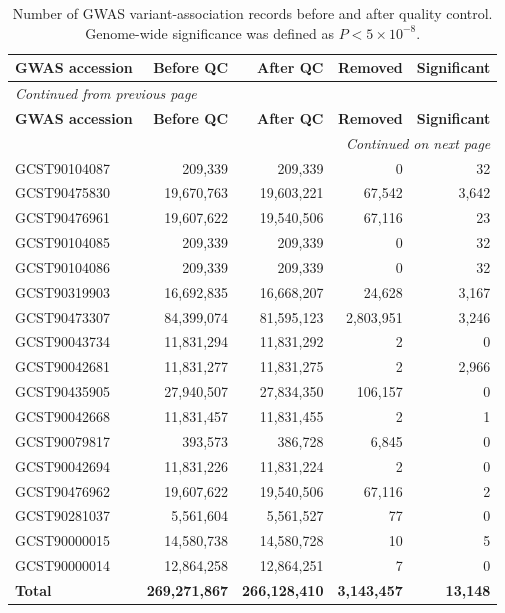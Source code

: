 \documentclass[11pt,a4paper]{article}
\begin{document}
\begin{longtable}{@{}lrrrr@{}}
\caption{Number of GWAS variant-association records
before and after quality control. Genome-wide
significance was defined as $P < 5 \times 10^{-8}$.}
\label{tab:gwas_qc_results}\\

\toprule
\textbf{GWAS accession} &
\textbf{Before QC} &
\textbf{After QC} &
\textbf{Removed} &
\textbf{Significant} \\
\midrule
\endfirsthead

\multicolumn{5}{l}{\textit{Continued from previous page}}\\
\toprule
\textbf{GWAS accession} &
\textbf{Before QC} &
\textbf{After QC} &
\textbf{Removed} &
\textbf{Significant} \\
\midrule
\endhead

\midrule
\multicolumn{5}{r}{\textit{Continued on next page}}\\
\endfoot
\bottomrule
\endlastfoot

GCST90104087 & 209,339 & 209,339 & 0 & 32 \\
GCST90475830 & 19,670,763 & 19,603,221 & 67,542 & 3,642 \\
GCST90476961 & 19,607,622 & 19,540,506 & 67,116 & 23 \\
GCST90104085 & 209,339 & 209,339 & 0 & 32 \\
GCST90104086 & 209,339 & 209,339 & 0 & 32 \\
GCST90319903 & 16,692,835 & 16,668,207 & 24,628 & 3,167 \\
GCST90473307 & 84,399,074 & 81,595,123 & 2,803,951 & 3,246 \\
GCST90043734 & 11,831,294 & 11,831,292 & 2 & 0 \\
GCST90042681 & 11,831,277 & 11,831,275 & 2 & 2,966 \\
GCST90435905 & 27,940,507 & 27,834,350 & 106,157 & 0 \\
GCST90042668 & 11,831,457 & 11,831,455 & 2 & 1 \\
GCST90079817 & 393,573 & 386,728 & 6,845 & 0 \\
GCST90042694 & 11,831,226 & 11,831,224 & 2 & 0 \\
GCST90476962 & 19,607,622 & 19,540,506 & 67,116 & 2 \\
GCST90281037 & 5,561,604 & 5,561,527 & 77 & 0 \\
GCST90000015 & 14,580,738 & 14,580,728 & 10 & 5 \\
GCST90000014 & 12,864,258 & 12,864,251 & 7 & 0 \\

\midrule
\textbf{Total} &
\textbf{269,271,867} &
\textbf{266,128,410} &
\textbf{3,143,457} &
\textbf{13,148} \\

\end{longtable}
\endgroup
\end{document}
